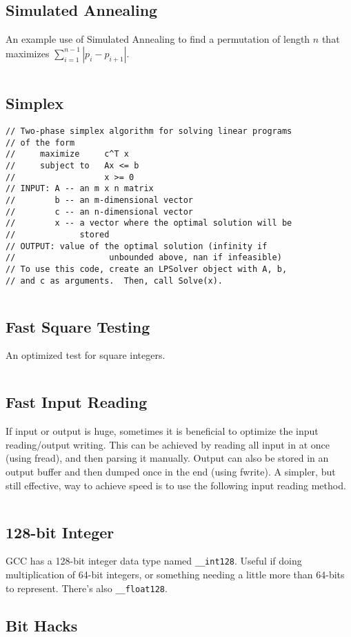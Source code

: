 \documentclass[8pt,a4paper,landscape,oneside]{amsart}
\newcommand{\code}[1]{\inputminted[fontsize=\normalsize,baselinestretch=1]{cpp}{_code/#1}}
\begin{document}
\begin{multicols*}{3}
  \subsection{Simulated Annealing}
    An example use of Simulated Annealing to find a permutation of length $n$
    that maximizes $\sum_{i=1}^{n-1}|p_i - p_{i+1}|$.
    \code{other/simulated_annealing.cpp}
  \subsection{Simplex}
    \begin{verbatim}
// Two-phase simplex algorithm for solving linear programs
// of the form
//     maximize     c^T x
//     subject to   Ax <= b
//                  x >= 0
// INPUT: A -- an m x n matrix
//        b -- an m-dimensional vector
//        c -- an n-dimensional vector
//        x -- a vector where the optimal solution will be
//             stored
// OUTPUT: value of the optimal solution (infinity if
//                   unbounded above, nan if infeasible)
// To use this code, create an LPSolver object with A, b,
// and c as arguments.  Then, call Solve(x).
    \end{verbatim}
    \code{other/simplex.cpp}
  \subsection{Fast Square Testing}
    An optimized test for square integers.
    \code{tricks/is_square.cpp}
  \subsection{Fast Input Reading}
    If input or output is huge, sometimes it is beneficial to optimize the
    input reading/output writing. This can be achieved by reading all input
    in at once (using fread), and then parsing it manually. Output can also
    be stored in an output buffer and then dumped once in the end (using
    fwrite). A simpler, but still effective, way to achieve speed is to use
    the following input reading method.
    \code{tricks/fast_input.cpp}
  \subsection{128-bit Integer}
    GCC has a 128-bit integer data type named \texttt{\_\_int128}. Useful
    if doing multiplication of 64-bit integers, or something needing a
    little more than 64-bits to represent. There's also
    \texttt{\_\_float128}.
  \subsection{Bit Hacks}
    \code{tricks/snoob.cpp}
\newpage

\end{multicols*}
\end{document}
